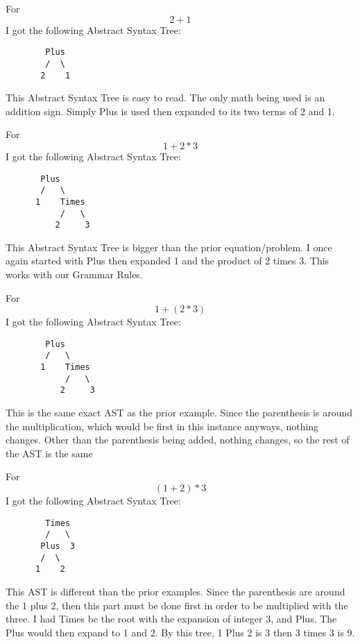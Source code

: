 \documentclass{article}
\theoremstyle{theorem}
\theoremstyle{definition}
\theoremstyle{remark}
\begin{document}
\noindent\newline For $$2+1$$ I got the following Abstract Syntax Tree:
\begin{verbatim}
        Plus
        /  \
       2    1
\end{verbatim}

\noindent\newline This Abstract Syntax Tree is easy to read. The only math being used is an addition sign. Simply Plus is used then expanded to its two terms of 2 and 1.


\noindent\newline\newline For $$1+2*3$$ I got the following Abstract Syntax Tree:
\begin{verbatim}
       Plus
       /   \
      1    Times
           /   \
          2     3
\end{verbatim}
\noindent\newline This Abstract Syntax Tree is bigger than the prior equation/problem. I once again started with Plus then expanded 1 and the product of 2 times 3. This works with our Grammar Rules. 

\noindent\newline\newline For $$1+(2*3)$$ I got the following Abstract Syntax Tree:
\begin{verbatim}
        Plus
        /   \
       1    Times
            /   \
           2     3
\end{verbatim}
\noindent\newline This is the same exact AST as the prior example. Since the parenthesis is around the multiplication, which would be first in this instance anyways, nothing changes. Other than the parenthesis being added, nothing changes, so the rest of the AST is the same

\noindent\newline\newline For $$(1+2)*3$$ I got the following Abstract Syntax Tree:

\begin{verbatim}
        Times
        /   \
       Plus  3
       /  \
      1    2
\end{verbatim}
\noindent\newline This AST is different than the prior examples. Since the parenthesis are around the 1 plus 2, then this part must be done first in order to be multiplied with the three. I had Times be the root with the expansion of integer 3, and Plus. The Plus would then expand to 1 and 2. By this tree, 1 Plus 2 is 3 then 3 times 3 is 9. 
\end{document}
